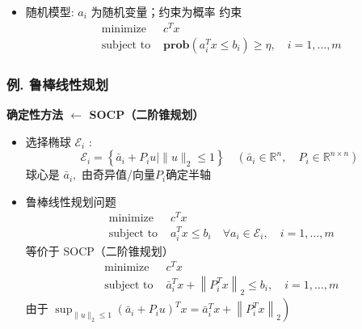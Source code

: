 \documentclass[handout]{beamer}
\newcommand{\zixue}{\hint{(自学)}}
\begin{document}
\begin{frame}
\begin{frame}
{\begin{itemize}[<+->]
				\item 随机模型: $a_{i}$ 为随机变量；约束为概率 约束
				\begin{equation}
					\begin{array}{ll}
						\text{ minimize } & c^{T} x \\
						\text { subject to } & \textbf {prob}\left(a_{i}^{T} x \leq b_{i}\right) \geq \eta, \quad i=1, \ldots, m
					\end{array}
				\end{equation}
			\end{itemize}
		}
	\end{frame}
	\begin{frame}
		\frametitle{例. 鲁棒线性规划}
		\textbf{确定性方法 $\leftarrow$ SOCP（二阶锥规划）\zixue}
		\begin{itemize}[<+->]
			\item 选择椭球 $\mathcal{E}_{i}$ :
			\begin{equation}
				\mathcal{E}_{i}=\left\{\bar{a}_{i}+P_{i} u \mid\|u\|_{2} \leq 1\right\} \quad\left(\bar{a}_{i} \in \mathbb{R}^{n}, \quad P_{i} \in \mathbb{R}^{n \times n}\right)
			\end{equation}
			球心是 $\bar{a}_{i},$ 由奇异值/向量$P_{i}$确定半轴
			\item 鲁棒线性规划问题
			\begin{equation}
				\begin{array}{ll}
					\text { minimize } & c^{T} x \\
					\text { subject to } & a_{i}^{T} x \leq b_{i} \quad \forall a_{i} \in \mathcal{E}_{i}, \quad i=1, \ldots, m
				\end{array}
			\end{equation}
			等价于 SOCP（二阶锥规划）
			\begin{equation}
				\begin{array}{ll}
					\text { minimize } & c^{T} x \\
					\text { subject to } & \bar{a}_{i}^{T} x+\left\|P_{i}^{T} x\right\|_{2} \leq b_{i}, \quad i=1, \ldots, m
				\end{array}
			\end{equation}
			由于 $\left.\sup _{\|u\|_{2} \leq 1}\left(\bar{a}_{i}+P_{i} u\right)^{T} x=\bar{a}_{i}^{T} x+\left\|P_{i}^{T} x\right\|_{2}\right)$
		\end{itemize}
	\end{frame}
	\begin{frame}

\end{frame}
\end{frame}
\end{document}
